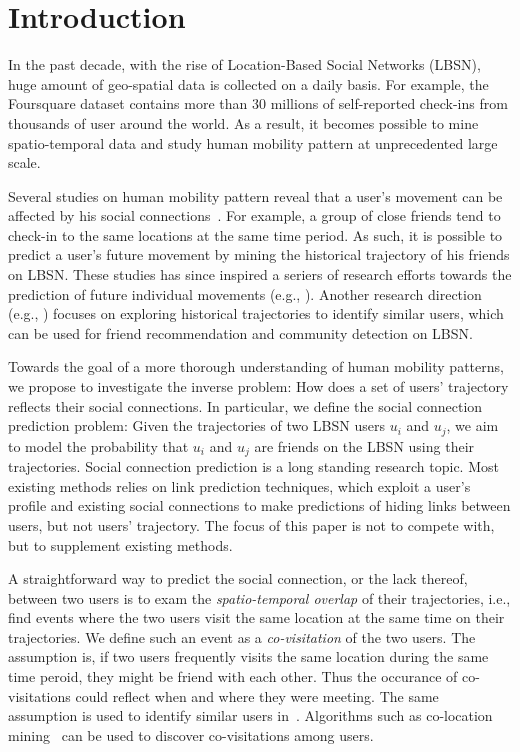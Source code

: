 \section{Introduction}\label{sec:intro}

In the past decade, with the rise of Location-Based Social Networks (LBSN), huge amount of geo-spatial data is collected on a daily basis. For example, the Foursquare\cite{yang2015nationtelescope} dataset contains more than 30 millions of self-reported check-ins from thousands of user around the world. As a result, it becomes possible to mine spatio-temporal data and study human mobility pattern at unprecedented large scale.

Several studies on human mobility pattern reveal that a user's movement can be affected by his social connections~\cite{cho2011friendship, ye2013s}. For example, a group of close friends tend to check-in to the same locations at the same time period. As such, it is possible to predict a user's future movement by mining the historical trajectory of his friends on LBSN. These studies has since inspired a seriers of research efforts towards the prediction of future individual movements (e.g., \cite{noulas2012mining, gao2012mobile, scellato2011nextplace, lian2013collaborative}). Another research direction (e.g., \cite{xiao2010finding}) focuses on exploring historical trajectories to identify similar users, which can be used for friend recommendation and community detection on LBSN. 


Towards the goal of a more thorough understanding of human mobility patterns, we propose to investigate the inverse problem:  How does a set of users' trajectory reflects their social connections. In particular, we define the social connection prediction problem: Given the trajectories of two LBSN users $u_i$ and $u_j$, we aim to model the probability that $u_i$ and $u_j$ are friends on the LBSN using their trajectories. Social connection prediction is a long standing research topic. Most existing methods relies on link prediction techniques, which exploit a user's profile and existing social connections to make predictions of hiding links between users, but not users' trajectory. The focus of this paper is not to compete with, but to supplement existing methods.

A straightforward way to predict the social connection, or the lack thereof, between two users is to exam the \textit{spatio-temporal overlap} of their trajectories, i.e., find events where the two users visit the same location at the same time on their trajectories. We define such an event as a \textit{co-visitation} of the two users. The assumption is, if two users frequently visits the same location during the same time peroid, they might be friend with each other. Thus the occurance of co-visitations could reflect when and where they were meeting. The same assumption is used to identify similar users in~\cite{xiao2010finding}. Algorithms such as co-location mining~\cite{weiler2015geo} can be used to discover co-visitations among users. 

